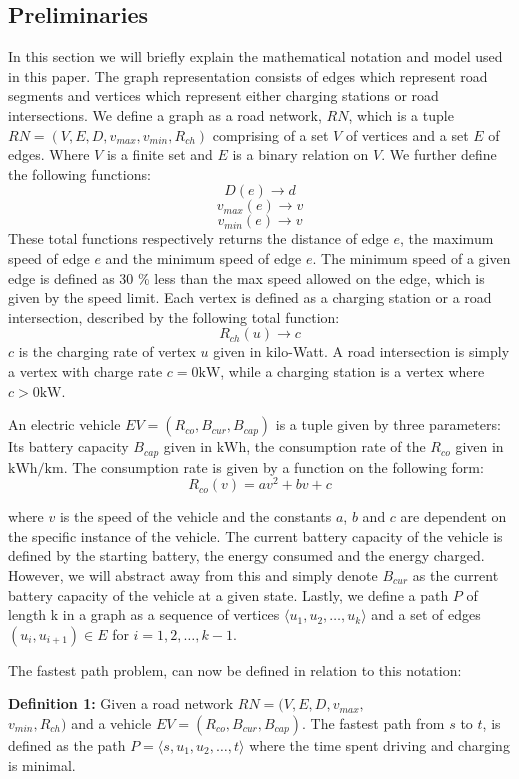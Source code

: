 \subsection{Preliminaries} \label{sec:notation}
In this section we will briefly explain the mathematical notation and model used in this paper. The graph representation consists of edges which represent road segments and vertices which represent either charging stations or road intersections. We define a graph as a road network, $RN$, which is a tuple $RN=(V,E,D,v_{max},v_{min},R_{ch})$ comprising of a set $V$ of vertices and a set $E$ of edges. Where $V$ is a finite set and $E$ is a binary relation on $V$. We further define the following functions:
\[ D(e)\rightarrow d \] 
\[ v_{max}(e)\rightarrow v \]
\[ v_{min}(e)\rightarrow v \]
These total functions respectively returns the distance of edge $e$, the maximum speed of edge $e$ and the minimum speed of edge $e$. The minimum speed of a given edge is defined as 30 \% less than the max speed allowed on the edge, which is given by the speed limit. Each vertex is defined as a charging station or a road intersection, described by the following total function:
\[R_{ch}(u)\rightarrow c\]
$c$ is the charging rate of vertex $u$ given in kilo-Watt. A road intersection is simply a vertex with charge rate $c = 0\si{\kW}$, while a charging station is a vertex where $c > 0\si{\kW}$. 

An electric vehicle $EV=(R_{co},B_{cur},B_{cap})$ is a tuple given by three parameters: Its battery capacity $B_{cap}$ given in $\si{\kWh}$, the consumption rate of the $R_{co}$ given in $\si{\kWh\per\km}$. The consumption rate is given by a function on the following form:
\[ R_{co}(v)=av^2+bv+c \]

where $v$ is the speed of the vehicle and the constants $a$, $b$ and $c$ are dependent on the specific instance of the vehicle. The current battery capacity of the vehicle is defined by the starting battery, the energy consumed and the energy charged. However, we will abstract away from this and simply denote $B_{cur}$ as the current battery capacity of the vehicle at a given state. Lastly, we define a path $P$ of length k in a graph as a sequence of vertices $\langle u_1,u_2,\dots,u_k \rangle$ and a set of edges $(u_{i},u_{i+1})\in E$ for $i=1,2,\dots,k-1$.

The fastest path problem, can now be defined in relation to this notation:

\textbf{Definition 1:} Given a road network $RN=(V,E,D,v_{max},$\\ 
$v_{min},R_{ch})$ and a vehicle $EV=(R_{co},B_{cur},B_{cap})$. The fastest path 
from $s$ to $t$, is defined as the path $P = \langle s,u_1,u_2,\dots,t \rangle$ where the time spent driving and charging is minimal.



